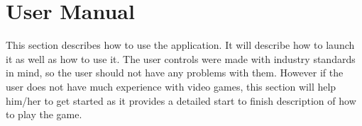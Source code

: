 \section{User Manual}
This section describes how to use the application. 
It will describe how to launch it as well as how to use it.
The user controls were made with industry standards in mind, so the user should not have any problems with them.
However if the user does not have much experience with video games, this section will help him/her to get started as it provides a detailed start to finish description of how to play the game.








